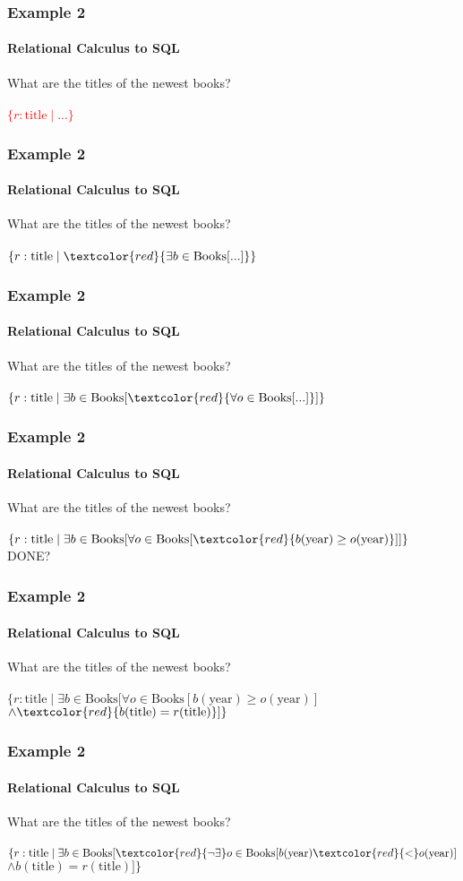 \documentclass{beamer}
\begin{document}
\begin{frame}
  \frametitle{Example 2}
    \framesubtitle{Relational Calculus to SQL}
  What are the titles of the newest books?\\
  \hfill \\
  \textcolor{red}{$\{r:\text{title} \mid ... \}$}
\end{frame}
\begin{frame}
  \frametitle{Example 2}
    \framesubtitle{Relational Calculus to SQL}
  What are the titles of the newest books?\\
  \hfill \\
  $\{r:\text{title} \mid \textcolor{red}{\exists b \in \text{Books} [...]} \}$
\end{frame}
\begin{frame}
  \frametitle{Example 2}
    \framesubtitle{Relational Calculus to SQL}
  What are the titles of the newest books?\\
  \hfill \\
  $\{r:\text{title} \mid \exists b \in \text{Books} [ \textcolor{red}{\forall o \in \text{Books} [...]} ] \}$
\end{frame}
\begin{frame}
  \frametitle{Example 2}
    \framesubtitle{Relational Calculus to SQL}
  What are the titles of the newest books?\\
  \hfill \\
  $\{r:\text{title} \mid \exists b \in \text{Books} [ \forall o \in \text{Books} [ \textcolor{red}{b(\text{year}) \geq o(\text{year})}]] \}$\\
  DONE?
\end{frame}
\begin{frame}
  \frametitle{Example 2}
    \framesubtitle{Relational Calculus to SQL}
  What are the titles of the newest books?\\
  \hfill \\
  $\{r:\text{title} \mid \exists b \in \text{Books} [ \forall o \in \text{Books} [ b(\text{year}) \geq o(\text{year})]$\\
  $\land \textcolor{red}{b(\text{title}) = r(\text{title})}] \}$
\end{frame}
\begin{frame}
  \frametitle{Example 2}
    \framesubtitle{Relational Calculus to SQL}
  What are the titles of the newest books?\\
  \hfill \\
  $\{r:\text{title} \mid \exists b \in \text{Books} [ \textcolor{red}{\neg\exists} o \in \text{Books} [ b(\text{year}) \textcolor{red}{<} o(\text{year})]$\\
  $\land b(\text{title}) = r(\text{title})] \}$
\end{frame}
\end{document}
